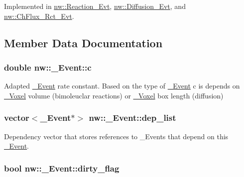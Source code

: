 Implemented in \hyperlink{classnw_1_1_reaction___evt_aaa2e896edd2263dbe78f5b5aa37fb091}{nw\+::\+Reaction\+\_\+\+Evt}, \hyperlink{classnw_1_1_diffusion___evt_a35841daf14d9ba472c0ed1f414187097}{nw\+::\+Diffusion\+\_\+\+Evt}, and \hyperlink{classnw_1_1_ch_flux___rct___evt_a4034ee90e8ec27a92665a5591fad165d}{nw\+::\+Ch\+Flux\+\_\+\+Rct\+\_\+\+Evt}.



\subsection{Member Data Documentation}
\hypertarget{classnw_1_1___event_a29c77fb164e745cdb5c5fda4f191cd37}{
\subsubsection[{c}]{\setlength{\rightskip}{0pt plus 5cm}double nw\+::\+\_\+\+Event\+::c\hspace{0.3cm}{\ttfamily [protected]}}}\label{classnw_1_1___event_a29c77fb164e745cdb5c5fda4f191cd37}


Adapted \hyperlink{classnw_1_1___event}{\+\_\+\+Event} rate constant. Based on the type of \hyperlink{classnw_1_1___event}{\+\_\+\+Event} {\ttfamily c} is depends on \hyperlink{classnw_1_1___voxel}{\+\_\+\+Voxel} volume (bimoleuclar reactions) or \hyperlink{classnw_1_1___voxel}{\+\_\+\+Voxel} box length (diffusion) 

\hypertarget{classnw_1_1___event_a3f87b2dff69d07977f0a5e10936f38f6}{
\subsubsection[{dep\+\_\+list}]{\setlength{\rightskip}{0pt plus 5cm}vector$<${\bf \+\_\+\+Event}$\ast$$>$ nw\+::\+\_\+\+Event\+::dep\+\_\+list\hspace{0.3cm}{\ttfamily [protected]}}}\label{classnw_1_1___event_a3f87b2dff69d07977f0a5e10936f38f6}


Dependency vector that stores references to \+\_\+\+Events that depend on this \hyperlink{classnw_1_1___event}{\+\_\+\+Event}. 

\hypertarget{classnw_1_1___event_aaa705b35c06c0cb2e0a4f3daa9ee8037}{
\subsubsection[{dirty\+\_\+flag}]{\setlength{\rightskip}{0pt plus 5cm}bool nw\+::\+\_\+\+Event\+::dirty\+\_\+flag\hspace{0.3cm}{\ttfamily [protected]}}}\label{classnw_1_1___event_aaa705b35c06c0cb2e0a4f3daa9ee8037}


